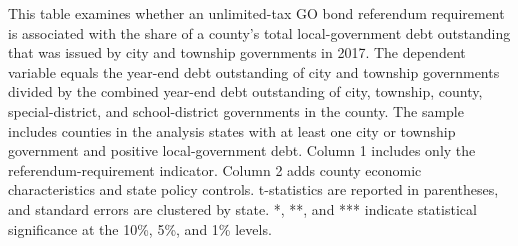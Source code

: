 \newpage
\begin{table}[H]\centering
\def\sym#1{\ifmmode^{#1}\else\(^{#1}\)\fi}
\begingroup
\caption{\textbf{GO bond referendums and the city share of county debt}}
\label{tab:county_debt}

\parbox{\textwidth}{This table examines whether an unlimited-tax GO bond referendum requirement is associated with the share of a county's total local-government debt outstanding that was issued by city and township governments in 2017. The dependent variable equals the year-end debt outstanding of city and township governments divided by the combined year-end debt outstanding of city, township, county, special-district, and school-district governments in the county. The sample includes counties in the analysis states with at least one city or township government and positive local-government debt. Column 1 includes only the referendum-requirement indicator. Column 2 adds county economic characteristics and state policy controls. t-statistics are reported in parentheses, and standard errors are clustered by state. *, **, and *** indicate statistical significance at the 10\%, 5\%, and 1\% levels.}
\endgroup
\end{table}


